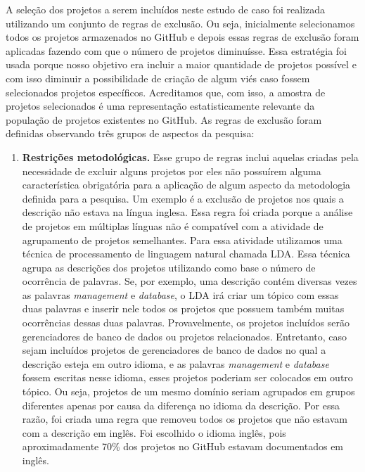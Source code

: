 A seleção dos projetos a serem incluídos neste estudo de caso foi realizada utilizando um conjunto de regras de exclusão. Ou seja, inicialmente selecionamos todos os projetos armazenados no GitHub e depois essas regras de exclusão foram aplicadas fazendo com que o número de projetos diminuísse. Essa estratégia foi usada porque nosso objetivo era incluir a maior quantidade de projetos possível e com isso diminuir a possibilidade de criação de algum viés caso fossem selecionados projetos específicos. Acreditamos que, com isso, a amostra de projetos selecionados é uma representação estatisticamente relevante da população de projetos existentes no GitHub.  As regras de exclusão foram definidas observando três grupos de aspectos da pesquisa:

\begin{enumerate}
\item \textbf{Restrições metodológicas.} Esse grupo de regras inclui aquelas criadas pela necessidade de excluir alguns projetos por eles não possuírem alguma característica obrigatória para a aplicação de algum aspecto da metodologia definida para a pesquisa. Um exemplo é a exclusão de projetos nos quais a descrição não estava na língua inglesa. Essa regra foi criada porque a análise de projetos em múltiplas línguas não é compatível com a atividade de agrupamento de projetos semelhantes. Para essa atividade utilizamos uma técnica de processamento de linguagem natural chamada LDA. Essa técnica agrupa as descrições dos projetos utilizando como base o número de ocorrência de palavras. Se, por exemplo, uma descrição contém diversas vezes as palavras \textit{management} e \textit{database}, o LDA irá criar um tópico com essas duas palavras e inserir nele todos os projetos que possuem também muitas ocorrências dessas duas palavras. Provavelmente, os projetos incluídos serão gerenciadores de banco de dados ou projetos relacionados. Entretanto, caso sejam incluídos projetos de gerenciadores de banco de dados no qual a descrição esteja em outro idioma, e as palavras \textit{management} e \textit{database} fossem escritas nesse idioma, esses projetos poderiam ser colocados em outro tópico. Ou seja, projetos de um mesmo domínio seriam agrupados em grupos diferentes apenas por causa da diferença no idioma da descrição. Por essa razão, foi criada uma regra que removeu todos os projetos que não estavam com a descrição em inglês. Foi escolhido o idioma inglês, pois aproximadamente 70\% dos projetos no GitHub estavam documentados em inglês.

\end{enumerate}
